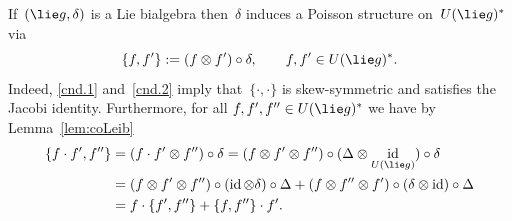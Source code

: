\documentclass[12pt, reqno]{amsart}
\theoremstyle{definition}
\numberwithin{equation}{section}
\newcommand{\tensor}{\otimes}
\DeclareMathOperator{\id}{id}
\begin{document}
If~$(\lie g,\delta)$ is a Lie bialgebra then~$\delta$ induces a Poisson structure on~$ U(\lie g)^*$
via
$$
\{f,f'\}:=(f\tensor f')\circ \delta,\qquad f,f'\in  U(\lie g)^*.
$$
Indeed, \ref{cnd.1} and~\ref{cnd.2} imply that~$\{\cdot,\cdot\}$
is skew-symmetric and satisfies the Jacobi identity. Furthermore, for all
$f,f',f''\in  U(\lie g)^*$
we have by Lemma~\ref{lem:coLeib}
\begin{align*}
\{f\cdot f',f''\}&=(f\cdot f'\tensor f'')\circ\delta=(f\tensor f'\tensor f'')\circ (\Delta\tensor\id_{U(\lie g)})\circ \delta
\\
&=(f\tensor f'\tensor f'')\circ(\id\tensor\delta)\circ\Delta+(f\tensor f''\tensor f')\circ (\delta\tensor\id)\circ\Delta
\\
&=f\cdot \{f',f''\}+\{f,f''\}\cdot f'.
\end{align*}
\end{document}
